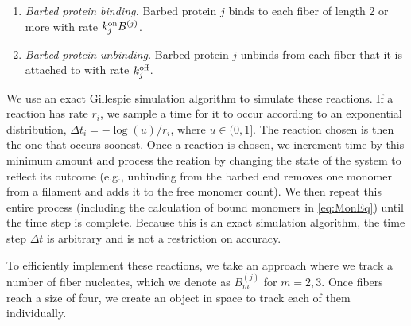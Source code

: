 \documentclass[11pt]{article}
\renewcommand{\j}[1]{{#1}^{(j)}}
\begin{document}
\begin{appendices}
\begin{enumerate}
\item \emph{Barbed protein binding.} Barbed protein $j$ binds to each fiber of length 2 or more with rate $\kon_j  \j B$. 
\item \emph{Barbed protein unbinding.} Barbed protein $j$ unbinds from each fiber that it is attached to with rate $k^\text{off}_j$.
\end{enumerate}
We use an exact Gillespie simulation algorithm \cite{gillespie2007stochastic} to simulate these reactions. If a reaction has rate $r_i$, we sample a time for it to occur according to an exponential distribution, $\Delta t_i=-\log(u)/r_i$, where $u \in (0,1]$. The reaction chosen is then the one that occurs soonest. Once a reaction is chosen, we increment time by this minimum amount and process the reation by changing the state of the system to reflect its outcome (e.g., unbinding from the barbed end removes one monomer from a filament and adds it to the free monomer count). We then repeat this entire process (including the calculation of bound monomers in \eqref{eq:MonEq}) until the time step is complete. Because this is an exact simulation algorithm, the time step $\Delta t$ is arbitrary and is not a restriction on accuracy.

To efficiently implement these reactions, we take an approach where we track a number of fiber nucleates, which we denote as $\j B_m$ for $m=2, 3$. Once fibers reach a size of four, we create an object in space to track each of them individually. 


\end{appendices}
\end{document}
